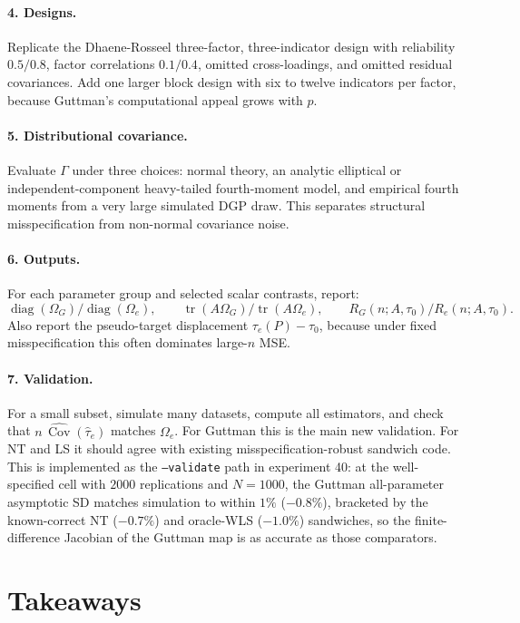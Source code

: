 \documentclass[11pt]{article}
\newcommand{\Cov}{\operatorname{Cov}}
\newcommand{\tr}{\operatorname{tr}}
\newcommand{\diag}{\operatorname{diag}}
\theoremstyle{plain}
\theoremstyle{remark}
\begin{document}
\paragraph{4. Designs.}
Replicate the Dhaene-Rosseel three-factor, three-indicator design with
reliability \(0.5/0.8\), factor correlations \(0.1/0.4\), omitted
cross-loadings, and omitted residual covariances. Add one larger block design
with six to twelve indicators per factor, because Guttman's computational
appeal grows with \(p\).

\paragraph{5. Distributional covariance.}
Evaluate \(\Gamma\) under three choices: normal theory, an analytic elliptical
or independent-component heavy-tailed fourth-moment model, and empirical
fourth moments from a very large simulated DGP draw. This separates structural
misspecification from non-normal covariance noise.

\paragraph{6. Outputs.}
For each parameter group and selected scalar contrasts, report:
\[
  \diag(\Omega_G)/\diag(\Omega_e),\qquad
  \tr(A\Omega_G)/\tr(A\Omega_e),\qquad
  R_G(n;A,\tau_0)/R_e(n;A,\tau_0).
\]
Also report the pseudo-target displacement
\(\tau_e(P)-\tau_0\), because under fixed misspecification this often dominates
large-\(n\) MSE.

\paragraph{7. Validation.}
For a small subset, simulate many datasets, compute all estimators, and check
that \(n\,\widehat{\Cov}(\hat\tau_e)\) matches \(\Omega_e\). For Guttman this
is the main new validation. For NT and LS it should agree with existing
misspecification-robust sandwich code. This is implemented as the
\texttt{--validate} path in experiment 40: at the well-specified cell with
\(2000\) replications and \(N=1000\), the Guttman all-parameter asymptotic
SD matches simulation to within \(1\%\) (\(-0.8\%\)), bracketed by the
known-correct NT (\(-0.7\%\)) and oracle-WLS (\(-1.0\%\)) sandwiches, so the
finite-difference Jacobian of the Guttman map is as accurate as those
comparators.

\section{Takeaways}
\end{document}
